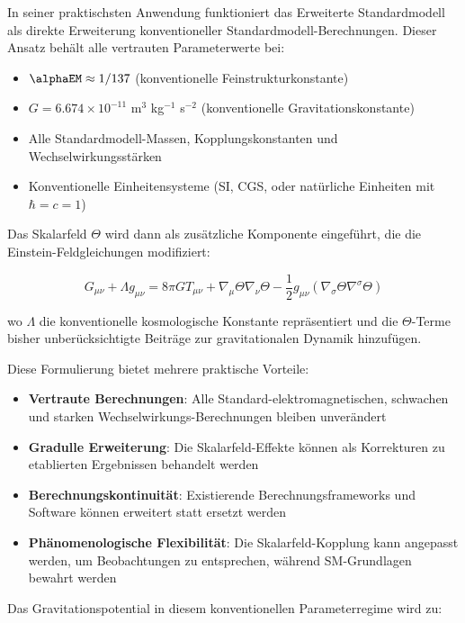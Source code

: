 	In seiner praktischsten Anwendung funktioniert das Erweiterte Standardmodell als direkte Erweiterung konventioneller Standardmodell-Berechnungen. Dieser Ansatz behält alle vertrauten Parameterwerte bei:
	
	\begin{itemize}
		\item $\alphaEM \approx 1/137$ (konventionelle Feinstrukturkonstante)
		\item $G = 6.674 \times 10^{-11}$ m$^3$ kg$^{-1}$ s$^{-2}$ (konventionelle Gravitationskonstante)
		\item Alle Standardmodell-Massen, Kopplungskonstanten und Wechselwirkungsstärken
		\item Konventionelle Einheitensysteme (SI, CGS, oder natürliche Einheiten mit $\hbar = c = 1$)
	\end{itemize}
	
	Das Skalarfeld $\Theta$ wird dann als zusätzliche Komponente eingeführt, die die Einstein-Feldgleichungen modifiziert:
	
	\begin{equation}
		G_{\mu\nu} + \Lambda g_{\mu\nu} = 8\pi G T_{\mu\nu} + \nabla_{\mu}\Theta\nabla_{\nu}\Theta - \frac{1}{2}g_{\mu\nu}(\nabla_{\sigma}\Theta\nabla^{\sigma}\Theta)
	\end{equation}
	
	wo $\Lambda$ die konventionelle kosmologische Konstante repräsentiert und die $\Theta$-Terme bisher unberücksichtigte Beiträge zur gravitationalen Dynamik hinzufügen.
	
	Diese Formulierung bietet mehrere praktische Vorteile:
	
	\begin{itemize}
		\item \textbf{Vertraute Berechnungen}: Alle Standard-elektromagnetischen, schwachen und starken Wechselwirkungs-Berechnungen bleiben unverändert
		\item \textbf{Gradulle Erweiterung}: Die Skalarfeld-Effekte können als Korrekturen zu etablierten Ergebnissen behandelt werden
		\item \textbf{Berechnungskontinuität}: Existierende Berechnungsframeworks und Software können erweitert statt ersetzt werden
		\item \textbf{Phänomenologische Flexibilität}: Die Skalarfeld-Kopplung kann angepasst werden, um Beobachtungen zu entsprechen, während SM-Grundlagen bewahrt werden
	\end{itemize}
	
	Das Gravitationspotential in diesem konventionellen Parameterregime wird zu:
	
